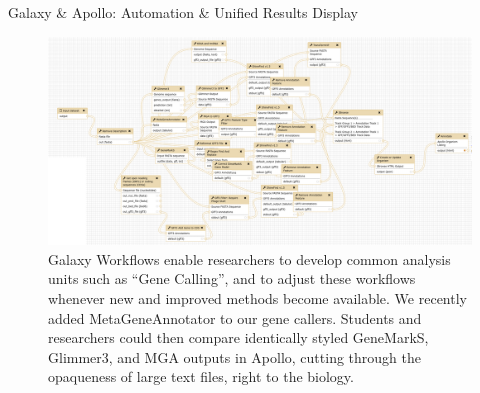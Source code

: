 \documentclass[final,t,20pt]{beamer}
\begin{document}
\begin{frame}[fragile]
\begin{columns}[t]
\begin{column}{.60\linewidth}
\begin{block}{Galaxy \& Apollo: Automation \& Unified Results Display }
                \begin{figure}
                    \includegraphics[width=\textwidth]{./media/workflow.png}
                    \caption{Galaxy Workflows enable researchers to develop
                    common analysis units such as ``Gene Calling'', and to
                    adjust these workflows whenever new and improved methods
                    become available. We recently added MetaGeneAnnotator to our
                    gene callers. Students and researchers could then
                    compare identically styled GeneMarkS, Glimmer3, and MGA
                    outputs in Apollo, cutting through the opaqueness of large text
                    files, right to the biology.}
                \end{figure}
            \end{block}
        \end{column}
  \end{columns}
\end{frame}
\end{document}
